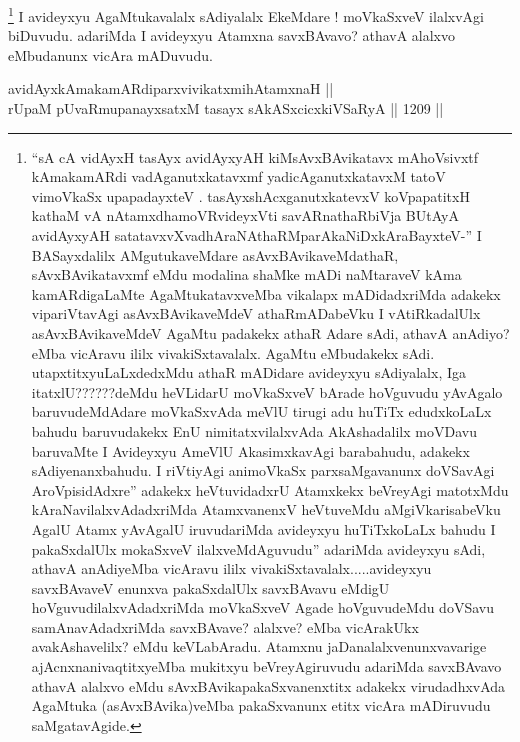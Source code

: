 \begin{artha}
\footnote{``sA cA vidAyxH tasAyx avidAyxyAH kiMsAvxBAvikatavx mAhoVsivxtf kAmakamARdi vadAganutxkatavxmf yadicAganutxkatavxM tatoV vimoVkaSx upapadayxteV . tasAyxshAcx\s \s ganutxkatevxV koVpapatitxH kathaM vA nA\s \s tamxdhamoVR\s videyxVti savARnathaRbiVja BUtAyA avidAyxyAH satatavxvXvadhAraNAthaRMparAkaNiDxkA\s \s raBayxteV-'' I BASayxdalilx AMgutukaveMdare asAvxBAvikaveMdathaR, sAvxBAvikatavxmf eMdu modalina shaMke mADi naMtaraveV kAma kamARdigaLaMte AgaMtukatavxveMba vikalapx mADidadxriMda adakekx vipariVtavAgi asAvxBAvikaveMdeV athaRmADabeVku I vAtiRkadalUlx asAvxBAvikaveMdeV AgaMtu padakekx athaR Adare sAdi, athavA anAdiyo? eMba vicAravu ililx vivakiSxtavalalx. AgaMtu eMbudakekx sAdi. utapxtitxyuLaLxdedxMdu athaR mADidare avideyxyu sAdiyalalx, Iga itatxlU??????deMdu heVLidarU moVkaSxveV bArade hoVguvudu yAvAgalo baruvudeMdAdare moVkaSxvAda meVlU tirugi adu huTiTx edudxkoLaLx bahudu baruvudakekx EnU nimitatxvilalxvAda AkAshadalilx moVDavu baruvaMte I Avideyxyu AmeVlU AkasimxkavAgi barabahudu, adakekx sAdiyenanxbahudu. I riVtiyAgi animoVkaSx parxsaMgavanunx doVSavAgi AroVpisidAdxre'' adakekx heVtuvidadxrU Atamxkekx beVreyAgi matotxMdu kAraNavilalxvAdadxriMda AtamxvanenxV heVtuveMdu aMgiVkarisabeVku AgalU Atamx yAvAgalU iruvudariMda avideyxyu huTiTxkoLaLx bahudu I pakaSxdalUlx mokaSxveV ilalxveMdAguvudu'' adariMda avideyxyu sAdi, athavA anAdiyeMba vicAravu ililx vivakiSxtavalalx.....avideyxyu savxBAvaveV enunxva pakaSxdalUlx savxBAvavu eMdigU hoVguvudilalxvAdadxriMda moVkaSxveV Agade hoVguvudeMdu doVSavu samAnavAdadxriMda savxBAvave? alalxve? eMba vicArakUkx avakAshavelilx? eMdu keVLabAradu. Atamxnu jaDanalalxvenunxvavarige ajAcnxnanivaqtitxyeMba mukitxyu beVreyAgiruvudu adariMda savxBAvavo athavA alalxvo eMdu sAvxBAvikapakaSxvanenxtitx adakekx virudadhxvAda AgaMtuka (asAvxBAvika)veMba pakaSxvanunx etitx vicAra mADiruvudu saMgatavAgide.} 
I avideyxyu AgaMtukavalalx sAdiyalalx EkeMdare ! moVkaSxveV ilalxvAgi biDuvudu. adariMda I avideyxyu Atamxna savxBAvavo? athavA alalxvo eMbudanunx vicAra mADuvudu.
\end{artha}


\begin{shl}
\footnotemark[2]avidAyxkAmakamARdiparxvivikatxmihA\s \s tamxnaH || \\
rUpaM pUvaRmupanayxsatxM tasayx sAkASxcicxkiVSaRyA \hfill || 1209 ||  
\end{shl}

